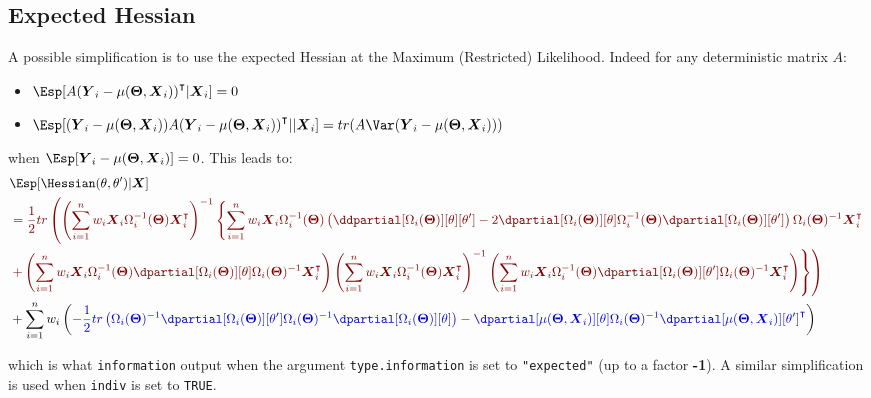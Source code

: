 \documentclass[12pt]{article}
\newcommand{\darkblue}{blue!80!black}
\newcommand{\darkred}{red!50!black}
\newcommand\trans[1]{{#1}^\intercal}%
\newcommand{\param}{\Theta}
\newcommand{\Vparam}{\boldsymbol{\param}}
\newcommand{\VX}{\boldsymbol{X}}
\newcommand{\VY}{\boldsymbol{Y}}
\begin{document}
\subsection{Expected Hessian}
\label{SM:likelihood:Ehessian}
A possible simplification is to use the expected Hessian at the Maximum (Restricted) Likelihood. Indeed for
any deterministic matrix \(A\):
\begin{itemize}
\item \(\Esp[A \trans{(\VY_i-\mu(\Vparam,\VX_i))}|\VX_i] = 0\)
\item \(\Esp[(\VY_i-\mu(\Vparam,\VX_i)) A \trans{(\VY_i-\mu(\Vparam,\VX_i))}||\VX_i] = tr(A \Var(\VY_i-\mu(\Vparam,\VX_i)))\)
\end{itemize}
when \(\Esp[\VY_i-\mu(\Vparam,\VX_i)]=0\). This leads to:
\begin{align}
 & \Esp[\Hessian(\theta,\theta^{\prime})|\VX] \notag\\ 
 &= \textcolor{\darkred}{ \frac{1}{2} tr \left( \left(\sum_{i=1}^n w_i \VX_i \Omega_i^{-1}(\Vparam) \trans{\VX}_i\right)^{-1}  \left\{ \sum_{i=1}^n w_i \VX_i \Omega_i^{-1}(\Vparam) \left( \ddpartial[\Omega_i(\Vparam)][\theta][\theta^{\prime}] - 2 \dpartial[\Omega_i(\Vparam)][\theta]  \Omega_i^{-1}(\Vparam) \dpartial[\Omega_i(\Vparam)][\theta^{\prime}]\right) \Omega_i(\Vparam)^{-1} \trans{\VX}_i \right.  \right.} \notag \\
 & \textcolor{\darkred}{ \left. \left. +  \left(\sum_{i=1}^n w_i \VX_i \Omega_i^{-1}(\Vparam) \dpartial[\Omega_i(\Vparam)][\theta] \Omega_i(\Vparam)^{-1} \trans{\VX}_i\right) \left(\sum_{i=1}^n w_i \VX_i \Omega_i^{-1}(\Vparam) \trans{\VX}_i \right)^{-1} \left(\sum_{i=1}^n w_i \VX_i \Omega_i^{-1}(\Vparam) \dpartial[\Omega_i(\Vparam)][\theta^{\prime}] \Omega_i(\Vparam)^{-1} \trans{\VX}_i\right) \right\} \right) } \notag\\
 & + \sum_{i=1}^n w_i \left( \textcolor{\darkblue}{
- \frac{1}{2} tr\left(\Omega_i(\Vparam)^{-1} \dpartial[\Omega_i(\Vparam)][\theta^{\prime}] \Omega_i(\Vparam)^{-1} \dpartial[\Omega_i(\Vparam)][\theta]\right)
 - \dpartial[\mu(\Vparam,\VX_i)][\theta] \Omega_i(\Vparam)^{-1} \trans{\dpartial[\mu(\Vparam,\VX_i)][\theta^{\prime}]}
 } \right) \label{eq:expectedInfo}
\end{align}

which is what \texttt{information} output when the argument
\texttt{type.information} is set to \texttt{"expected"} (up to a factor \textbf{-1}). A
similar simplification is used when \texttt{indiv} is set to \texttt{TRUE}.
\end{document}
